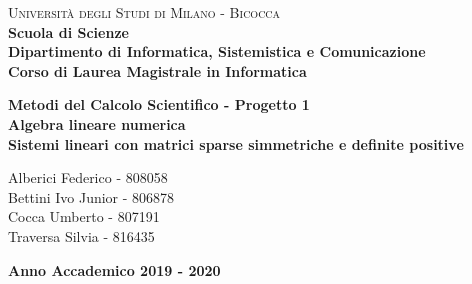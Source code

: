 \documentclass[a4paper,10pt]{article}
\begin{document}
\begin{titlepage}
\noindent
    \vspace*{5mm}
	\begin{minipage}[t]{0.15\textwidth}
	    \vspace*{5mm}
	\end{minipage}
	\hspace{1cm}
	\begin{minipage}[t]{0.90\textwidth}
	      \vspace*{5mm}
		{
			{\textsc{Università degli Studi di Milano - Bicocca} } \\
			\textbf{Scuola di Scienze} \\
			\textbf{Dipartimento di Informatica, Sistemistica e Comunicazione} \\
			\textbf{Corso di Laurea Magistrale in Informatica} \\
			\par
		}
	\end{minipage}
	
	\vspace{42mm}

\begin{center}
    {\LARGE{
    
            \textbf{Metodi del Calcolo Scientifico - Progetto 1 \\ Algebra lineare numerica \\ Sistemi lineari con matrici sparse simmetriche e deﬁnite positive}
    }}        
\end{center}

\vspace{40mm}
	
	
	\begin{flushright}
		\large{Alberici Federico - 808058\\} 
		\large{Bettini Ivo Junior - 806878\\} 
		\large{Cocca Umberto - 807191\\} 
		\large{Traversa Silvia - 816435} 
	\end{flushright}
	
	\vspace{15mm}
	\begin{center}
		{\large{\bf Anno Accademico 2019 - 2020}}
	\end{center}


\end{titlepage}
\end{document}
